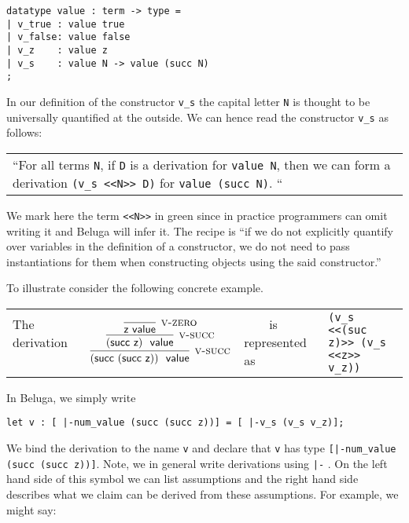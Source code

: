 \begin{lstlisting}
datatype value : term -> type =
| v_true : value true
| v_false: value false
| v_z    : value z
| v_s    : value N -> value (succ N)
;
\end{lstlisting}

In our definition of the constructor \lstinline!v_s! the capital letter
\lstinline!N! is thought to be universally quantified at the outside. We can
hence read the constructor \lstinline!v_s! as follows:

\begin{center}
\begin{tabular}{p{12cm}}
``For all terms
\lstinline$N$, if \lstinline!D! is a derivation for \lstinline!value N!, then we can form a derivation
\lstinline!(v_s <<N>> D)! for \lstinline!value (succ N)!. ``
\end{tabular}
\end{center}


We mark here the term \lstinline!<<N>>! in green since in practice programmers
can omit writing it and Beluga will infer it. The recipe is ``if we do not
explicitly quantify over variables in the definition of a constructor, we do not
need to pass instantiations for them when constructing objects using the said constructor.''

To illustrate consider the following concrete example.\\[1em]

\begin{tabular}{llll}
The derivation ~~~~&
$
\infer[\Vsuc]{(\tmsucc (\tmsucc \tmzero))~\isv}
{\infer[\Vsuc]{(\tmsucc \tmzero)~\isv}{
 \infer[\Vzero]{\tmzero \isv}{}
 }
}
$
& ~~~~is represented as &  \lstinline!(v_s <<(suc z)>> (v_s <<z>> v_z))!\\[1em]
\end{tabular}

In Beluga, we simply write

\begin{lstlisting}
let v : [ |-num_value (succ (succ z))] = [ |-v_s (v_s v_z)];
\end{lstlisting}

We bind the derivation to the name \lstinline!v! and declare that \lstinline!v!
has type \lstinline![|-num_value (succ (succ z))]!. Note, we in general write
derivations using \lstinline!|-! . On the left hand side of this symbol we can
list assumptions and the right hand side describes what we claim can be derived
from these assumptions.  For example, we might say:

